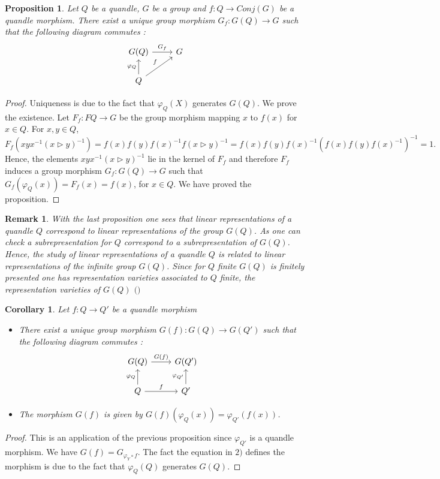 \documentclass[12pt, reqno]{amsart}
\newtheorem{proposition}[theorem]{Proposition}
\newtheorem{corollary}[theorem]{Corollary}
\newtheorem{remark}[theorem]{Remark}
\begin{document}
\begin{proposition}\label{univ}
Let $Q$ be a quandle, $G$ be a group and $f:Q\to Conj(G)$ be a quandle morphism. There exist a unique group morphism $G_f:G(Q)\to G$ such that the following diagram commutes :
$$\begin{tikzcd}
G(Q) \arrow{r}{G_f} &G  \\ 
Q \arrow{u}{\varphi_Q} \arrow{ru}{f} & 
\end{tikzcd} $$
\end{proposition}
\begin{proof}
Uniqueness is due to the fact that $\varphi_Q(X)$ generates $G(Q)$. We prove the existence. Let $F_f:FQ\to G$ be the group morphism mapping $x$ to $f(x)$ for $x\in Q$. For $x,y \in Q$, 
$$F_f(xyx^{-1}(x\triangleright y)^{-1})=f(x)f(y)f(x)^{-1}f(x\triangleright y)^{-1}=f(x)f(y)f(x)^{-1}(f(x)f(y)f(x)^{-1})^{-1}=1.$$
Hence, the elements $xyx^{-1}(x\triangleright y)^{-1}$ lie in the kernel of $F_f$ and therefore $F_f$ induces a group morphism $G_f :G(Q)\to G$ such that $G_f(\varphi_Q(x))=F_f(x)=f(x)$, for $x\in Q$. We have proved the proposition.
\end{proof}
\begin{remark}
With the last proposition one sees that linear representations of a quandle $Q$ correspond to linear representations of the group $G(Q)$. As one can check a subrepresentation for $Q$ correspond to a subrepresentation of $G(Q)$. Hence, the study of linear representations of a quandle $Q$ is related to linear representations of the infinite group $G(Q)$.  Since for $Q$ finite $G(Q)$ is finitely presented one has representation varieties associated to $Q$ finite, the representation varieties of $G(Q)$ $($\cite{Mag}$)$
\end{remark}
\begin{corollary}\label{fun}
Let $f:Q\to Q'$ be a quandle morphism
\begin{itemize}
\item[1)] There exist a unique group morphism $G(f) : G(Q) \to G(Q')$ such that the following diagram commutes : 
$$\begin{tikzcd}
G(Q) \arrow{r}{G(f)} &G(Q')  \\ 
Q\arrow{u}{\varphi_Q} \arrow{r}{f} & Q'\arrow{u}{\varphi_{Q'}} 
\end{tikzcd} $$
\item[2)] The morphism $G(f)$ is given by $G(f)(\varphi_Q(x))=\varphi_{Q'}(f(x))$.
\end{itemize}
\end{corollary}
\begin{proof}
This is an application of the previous proposition since $\varphi_{Q'}$ is a quandle morphism. We have $G(f)=G_{\varphi_Y \circ f}$. The fact the equation in $2)$ defines the morphism is due to the fact that $\varphi_Q(Q)$ generates $G(Q)$.
\end{proof}
\end{document}
